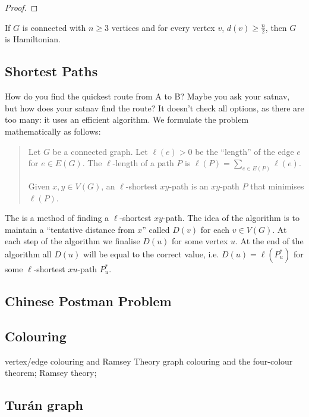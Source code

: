 \begin{proof}

\end{proof}

\begin{corollary}
If $G$ is connected with $n\ge3$ vertices and for every vertex $v$, $d(v)\ge\frac{n}{2}$, then $G$ is Hamiltonian.
\end{corollary}

\subsection{Shortest Paths}
How do you find the quickest route from A to B? Maybe you ask your satnav, but how does your satnav find the route? It doesn't check all options, as there are too many: it uses an efficient algorithm. We formulate the problem mathematically as follows:

\begin{quote}
Let $G$ be a connected graph. Let $\ell(e)>0$ be the ``length'' of the edge $e$ for $e\in E(G)$. The $\ell$-length of a path $P$ is $\ell(P)=\sum_{e\in E(P)}\ell(e)$.

Given $x,y\in V(G)$, an $\ell$-shortest $xy$-path is an $xy$-path $P$ that minimises $\ell(P)$.
\end{quote}

The  is a method of finding a $\ell$-shortest $xy$-path. The idea of the algorithm is to maintain a ``tentative distance from $x$'' called $D(v)$ for each $v\in V(G)$. At each step of the algorithm we finalise $D(u)$ for some vertex $u$. At the end of the algorithm all $D(u)$ will be equal to the correct value, i.e. $D(u)=\ell(P_u^*)$ for some $\ell$-shortest $xu$-path $P_u^*$.

\subsection{Chinese Postman Problem}

\subsection{Colouring}
vertex/edge colouring and Ramsey Theory
graph colouring and the four-colour theorem; Ramsey theory; 

\subsection{Tur\'{a}n graph}


